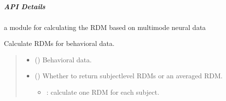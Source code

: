 \documentclass[letterpaper,10pt,english]{sphinxhowto}
\begin{document}
\subparagraph{API Details}
\label{\detokenize{rdm_cal:module-neurora.rdm_cal}}\label{\detokenize{rdm_cal:api-details}}
\sphinxAtStartPar
a module for calculating the RDM based on multimode neural data

\begin{fulllineitems}
\label{\detokenize{rdm_cal:neurora.rdm_cal.bhvRDM}}
\pysigstartsignatures
{}
\pysigstopsignatures
\sphinxAtStartPar
Calculate RDMs for behavioral data.
\begin{quote}\begin{description}
\begin{itemize}
\item {} 
\sphinxAtStartPar
{} (\sphinxstyleliteralemphasis{\sphinxupquote{, }}\sphinxstyleliteralemphasis{\sphinxupquote{ {[}}}\sphinxstyleliteralemphasis{\sphinxupquote{, }}\sphinxstyleliteralemphasis{\sphinxupquote{, }}\sphinxstyleliteralemphasis{\sphinxupquote{{]}}}) \textendash{} Behavioral data.

\item {} 
\sphinxAtStartPar
{} (\sphinxstyleliteralemphasis{\sphinxupquote{, }}\sphinxstyleliteralemphasis{\sphinxupquote{, }}) \textendash{} 
\sphinxAtStartPar
Whether to return subject\sphinxhyphen{}level RDMs or an averaged RDM.
\begin{itemize}
\item {} 
: calculate one RDM for each subject.


\end{itemize}
\end{itemize}
\end{description}
\end{quote}
\end{fulllineitems}
\end{document}
